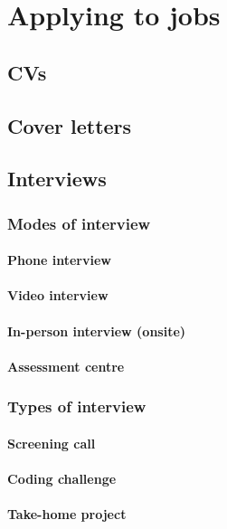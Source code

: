 \chapter{Applying to jobs}
\newcommand{\email}[1]{
\noindent\fbox{%
    \parbox{\textwidth}{%
	#1
    }%
}
}

\section{CVs}

\section{Cover letters}

\section{Interviews}
\subsection{Modes of interview}
\subsubsection{Phone interview}
\subsubsection{Video interview}
\subsubsection{In-person interview (onsite)}
\subsubsection{Assessment centre}

\subsection{Types of interview}
\subsubsection{Screening call}
\subsubsection{Coding challenge}
\subsubsection{Take-home project}
